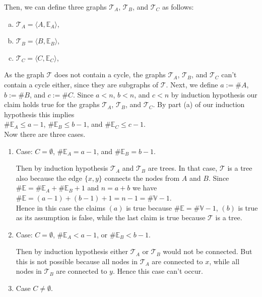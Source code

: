 \begin{enumerate}
\begin{enumerate}[(a)]
  \end{enumerate}
  Then, we can define three graphs $\mathcal{T}_A$, $\mathcal{T}_B$, and $\mathcal{T}_C$ as follows:
  \begin{enumerate}[(a)]
  \item $\mathcal{T}_A = \langle A, \mathbb{E}_A \rangle$,
  \item $\mathcal{T}_B = \langle B, \mathbb{E}_B \rangle$,
  \item $\mathcal{T}_C = \langle C, \mathbb{E}_C \rangle$,
  \end{enumerate}
  As the graph $\mathcal{T}$ does not contain a cycle, the graphs $\mathcal{T}_A$, $\mathcal{T}_B$, and $\mathcal{T}_C$ can't contain a cycle either,
  since they are subgraphs of $\mathcal{T}$.  Next, we define $a := \# A$, $b := \# B$, and $c := \# C$.
  Since $a < n$, $b < n$, and $c < n$ by induction hypothesis our claim holds true for the graphs  $\mathcal{T}_A$, $\mathcal{T}_B$, and
  $\mathcal{T}_C$.  By part (a) of our induction hypothesis this implies
    \\[0.2cm]
  \hspace*{1.3cm}
  $\# \mathbb{E}_A \leq a - 1$, \quad
  $\# \mathbb{E}_B \leq b - 1$, \quad and \quad $\# \mathbb{E}_C \leq c - 1$.
  \\[0.2cm]
  Now there are three cases.
  \begin{enumerate}
  \item Case: $C = \emptyset$, $\#\mathbb{E}_A = a - 1$, and $\#\mathbb{E}_B = b - 1$.
    
    Then by induction hypothesis $\mathcal{T}_A$ and $\mathcal{T}_B$ are trees.  In that case, $\mathcal{T}$ is
    a tree also because the edge $\{x,y\}$ connects the nodes from $A$ and $B$.
    Since $\#\mathbb{E} = \#\mathbb{E}_A + \#\mathbb{E}_B + 1$ and $n = a + b$ we have
    \\[0.2cm]
    \hspace*{1.3cm}
    $\#\mathbb{E} = (a - 1) + (b - 1) + 1 = n - 1 = \#\mathbb{V} - 1$.
    \\[0.2cm]
    Hence in this case the claims $(a)$ is true because $\# \mathbb{E} = \# \mathbb{V} - 1$, $(b)$  is true as
    its assumption is false,  while the last claim is true because $\mathcal{T}$ is a tree.
    \green{$\surd$}
  \item Case: $C = \emptyset$, $\#\mathbb{E}_A < a - 1$, or $\#\mathbb{E}_B < b - 1$.
    
    Then by induction hypothesis either $\mathcal{T}_A$ or $\mathcal{T}_B$ would not be connected.  But this is
    not possible because all nodes in $\mathcal{T}_A$ are connected to $x$, while all nodes in
    $\mathcal{T}_B$ are connected to $y$.  Hence this case can't occur.
    \green{$\surd$}
  \item Case $C \not= \emptyset$.


\end{enumerate}
\end{enumerate}
